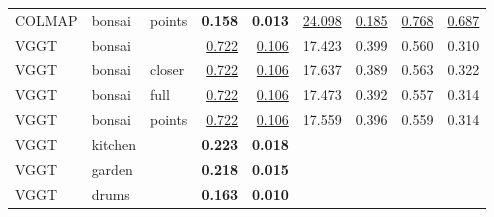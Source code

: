 \begin{table}[H]
\begin{tabular}{lllrrrrrr}
COLMAP & bonsai & points & \textbf{0.158} & \textbf{0.013} & \underline{24.098} & \underline{0.185} & \underline{0.768} & \underline{0.687} \\
VGGT & bonsai &  & \underline{0.722} & \underline{0.106} & 17.423 & 0.399 & 0.560 & 0.310 \\
VGGT & bonsai & closer & \underline{0.722} & \underline{0.106} & 17.637 & 0.389 & 0.563 & 0.322 \\
VGGT & bonsai & full & \underline{0.722} & \underline{0.106} & 17.473 & 0.392 & 0.557 & 0.314 \\
VGGT & bonsai & points & \underline{0.722} & \underline{0.106} & 17.559 & 0.396 & 0.559 & 0.314 \\
\midrule
VGGT & kitchen &  & \textbf{0.223} & \textbf{0.018} &  &  &  &  \\
\midrule
VGGT & garden &  & \textbf{0.218} & \textbf{0.015} &  &  &  &  \\
\midrule
VGGT & drums &  & \textbf{0.163} & \textbf{0.010} &  &  &  &  \\
\bottomrule
\end{tabular}
\end{table}